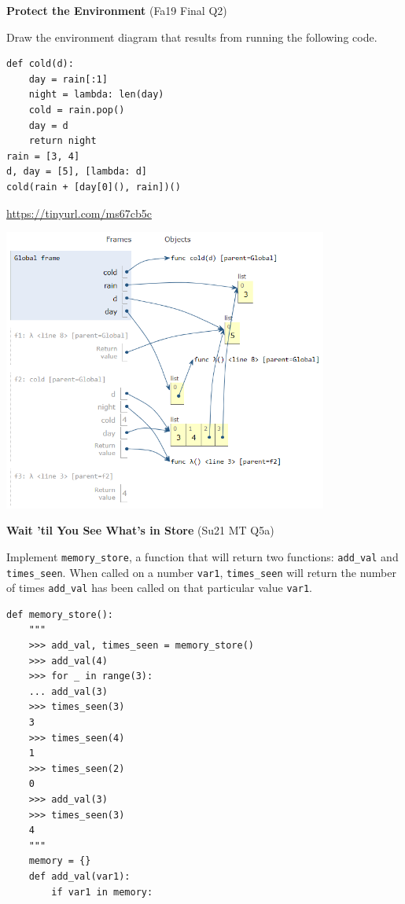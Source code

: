\documentclass{exam}
\newlength{\currentparskip}
\newenvironment{blocksection}
{
    \setlength{\currentparskip}{\parskip}%
    \begin{minipage}{\linewidth}
    \setlength{\parskip}{\currentparskip}%
}
{
    \end{minipage}
}
\begin{document}
\begin{questions}
\begin{blocksection}
\question \textbf{Protect the Environment} (Fa19 Final Q2)

Draw the environment diagram that results from running the following code.
\begin{lstlisting}
def cold(d):
    day = rain[:1]
    night = lambda: len(day)
    cold = rain.pop()
    day = d
    return night
rain = [3, 4]
d, day = [5], [lambda: d]
cold(rain + [day[0](), rain])()
\end{lstlisting}
\begin{solution}[5in]
    \url{https://tinyurl.com/ms67cb5c}

    \includegraphics[width=0.8\textwidth]{protecttheenvironment.png}
\end{solution}
\end{blocksection}

\begin{blocksection}
\question \textbf{Wait 'til You See What's in Store} (Su21 MT Q5a)

Implement \lstinline{memory_store}, a function that will return two functions: \lstinline{add_val} and \lstinline{times_seen}. When called on a number \lstinline{var1}, \lstinline{times_seen} will return the number of times \lstinline{add_val} has been called on that particular value \lstinline{var1}.

\begin{lstlisting}
def memory_store():
    """
    >>> add_val, times_seen = memory_store()
    >>> add_val(4)
    >>> for _ in range(3):
    ... add_val(3)
    >>> times_seen(3)
    3
    >>> times_seen(4)
    1
    >>> times_seen(2)
    0
    >>> add_val(3)
    >>> times_seen(3)
    4
    """
    memory = {}
    def add_val(var1):
        if var1 in memory:


\end{lstlisting}
\end{blocksection}
\end{questions}
\end{document}
